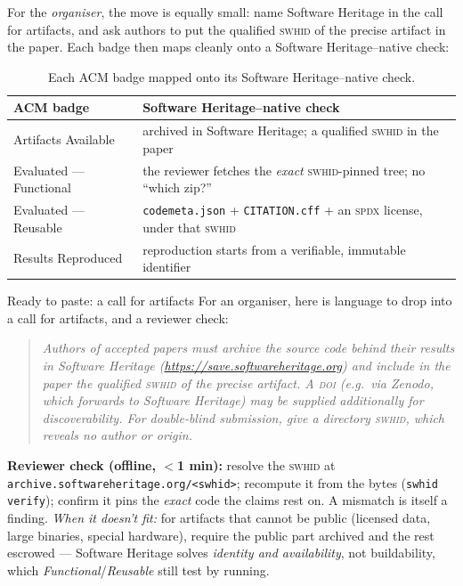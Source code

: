 For the \emph{organiser}, the move is equally small: name Software Heritage in the call for
artifacts, and ask authors to put the qualified \textsc{swhid} of the precise artifact in the paper.
Each badge then maps cleanly onto a Software Heritage--native check:

\begin{table}[htbp]
  \centering\small
  \begin{tabularx}{\linewidth}{@{}lX@{}}
    \toprule
    \textbf{ACM badge} & \textbf{Software Heritage--native check} \\
    \midrule
    Artifacts Available     & archived in Software Heritage; a qualified \textsc{swhid} in the paper \\
    Evaluated --- Functional & the reviewer fetches the \emph{exact} \textsc{swhid}-pinned tree; no ``which zip?'' \\
    Evaluated --- Reusable   & \texttt{codemeta.json} + \texttt{CITATION.cff} + an \textsc{spdx} license, under that \textsc{swhid} \\
    Results Reproduced      & reproduction starts from a verifiable, immutable identifier \\
    \bottomrule
  \end{tabularx}
  \caption[Badges mapped to Software Heritage checks]{Each ACM badge mapped onto its Software Heritage--native check.}
  \label{tab:badge-crosswalk}
\end{table}


\begin{callout}{Ready to paste: a call for artifacts}
\small For an organiser, here is language to drop into a call for artifacts, and a reviewer check:
\begin{quote}\itshape
Authors of accepted papers must archive the source code behind their results in Software Heritage
(\url{https://save.softwareheritage.org}) and include in the paper the \emph{qualified}
\textsc{swhid} of the precise artifact. A \textsc{doi} (e.g.\ via Zenodo, which forwards to Software
Heritage) may be supplied additionally for discoverability. For double-blind submission, give a
\emph{directory} \textsc{swhid}, which reveals no author or origin.
\end{quote}
\textbf{Reviewer check (offline, $<$1 min):} resolve the \textsc{swhid} at
\texttt{archive.softwareheritage.org/<swhid>}; recompute it from the bytes (\texttt{swhid verify});
confirm it pins the \emph{exact} code the claims rest on. A mismatch is itself a finding. \emph{When
it doesn't fit:} for artifacts that cannot be public (licensed data, large binaries, special
hardware), require the public part archived and the rest escrowed --- Software Heritage solves \emph{identity and
availability}, not buildability, which \emph{Functional}/\emph{Reusable} still test by running.
\end{callout}

